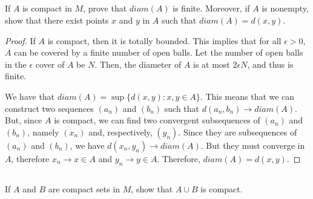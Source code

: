 \subsection{} If $A$ is compact in $M$, prove that $diam(A)$ is finite. Moreover, if $A$ is nonempty, show that there exist points $x$ and $y$ in $A$  such that $diam(A) = d(x, y)$.

\begin{proof}
If $A$ is compact, then it is totally bounded. This implies that for all $\epsilon > 0$, $A$ can be covered by a finite number of open balls. Let the number of open balls in the $\epsilon$ cover of $A$ be $N$. Then, the diameter of $A$ is at most $2\epsilon N$, and thus is finite.

We have that $diam(A) = \sup\{d(x,y): x,y \in A\}$. This means that we can construct two sequences $(a_n)$ and $(b_n)$ such that $d(a_n, b_n) \rightarrow diam(A)$. But, since $A$ is compact, we can find two convergent subsequences of $(a_n)$ and $(b_n)$, namely $(x_n)$ and, respectively, $(y_n)$. Since they are subsequences of $(a_n)$ and $(b_n)$, we have $d(x_n, y_n) \rightarrow diam(A)$. But they must converge in $A$, therefore $x_n \rightarrow x \in A$ and $y_n \rightarrow y \in A$. Therefore, $diam(A) = d(x,y)$.
\end{proof}

\subsection{} If $A$ and $B$ are compact sets in $M$, show that $A \cup B$ is compact.

